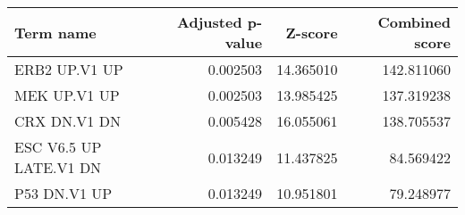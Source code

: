\begin{tabular}{lrrr}
\toprule
             Term name &  Adjusted p-value &   Z-score &  Combined score \\
\midrule
         ERB2 UP.V1 UP &          0.002503 & 14.365010 &      142.811060 \\
          MEK UP.V1 UP &          0.002503 & 13.985425 &      137.319238 \\
          CRX DN.V1 DN &          0.005428 & 16.055061 &      138.705537 \\
ESC V6.5 UP LATE.V1 DN &          0.013249 & 11.437825 &       84.569422 \\
          P53 DN.V1 UP &          0.013249 & 10.951801 &       79.248977 \\
\bottomrule
\end{tabular}
